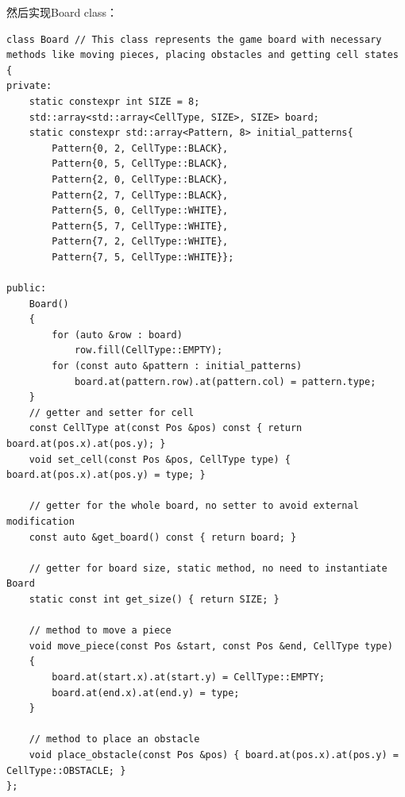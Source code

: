 然后实现Board class：
\begin{verbatim}
class Board // This class represents the game board with necessary methods like moving pieces, placing obstacles and getting cell states
{
private:
    static constexpr int SIZE = 8;
    std::array<std::array<CellType, SIZE>, SIZE> board;
    static constexpr std::array<Pattern, 8> initial_patterns{
        Pattern{0, 2, CellType::BLACK},
        Pattern{0, 5, CellType::BLACK},
        Pattern{2, 0, CellType::BLACK},
        Pattern{2, 7, CellType::BLACK},
        Pattern{5, 0, CellType::WHITE},
        Pattern{5, 7, CellType::WHITE},
        Pattern{7, 2, CellType::WHITE},
        Pattern{7, 5, CellType::WHITE}};

public:
    Board()
    {
        for (auto &row : board)
            row.fill(CellType::EMPTY);
        for (const auto &pattern : initial_patterns)
            board.at(pattern.row).at(pattern.col) = pattern.type;
    }
    // getter and setter for cell
    const CellType at(const Pos &pos) const { return board.at(pos.x).at(pos.y); }
    void set_cell(const Pos &pos, CellType type) { board.at(pos.x).at(pos.y) = type; }

    // getter for the whole board, no setter to avoid external modification
    const auto &get_board() const { return board; }

    // getter for board size, static method, no need to instantiate Board
    static const int get_size() { return SIZE; }

    // method to move a piece
    void move_piece(const Pos &start, const Pos &end, CellType type)
    {
        board.at(start.x).at(start.y) = CellType::EMPTY;
        board.at(end.x).at(end.y) = type;
    }

    // method to place an obstacle
    void place_obstacle(const Pos &pos) { board.at(pos.x).at(pos.y) = CellType::OBSTACLE; }
};
\end{verbatim}

